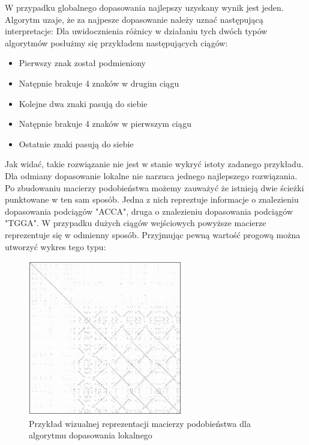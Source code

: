 \documentclass[a4paper,12pt]{article}
\newenvironment{lista}{
\begin{itemize}
  \setlength{\itemsep}{1pt}
  \setlength{\parskip}{0pt}
  \setlength{\parsep}{0pt}
}{\end{itemize}}
\begin{document}
W przypadku globalnego dopasowania najlepszy uzyskany wynik jest jeden. Algorytm uzaje, że za najpesze dopasowanie należy uznać następującą interpretacje: 
Dla uwidocznienia różnicy w działaniu tych dwóch typów algorytmów posłużmy się przykładem następujących ciągów:
\begin{lista}
 \item Pierwszy znak został podmieniony
\item Natępnie brakuje 4 znaków w drugim ciągu
\item Kolejne dwa znaki pasują do siebie
\item Natępnie brakuje 4 znaków w pierwszym ciągu
\item Ostatnie znaki pasują do siebie
\end{lista}

Jak widać, takie rozwiązanie nie jest w stanie wykryć istoty zadanego przykładu. Dla odmiany dopasowanie lokalne nie narzuca jednego najlepszego rozwiązania. Po zbudowaniu macierzy podobieństwa możemy zauważyć że istnieją dwie ścieżki punktowane w ten sam sposób. Jedna z nich repreztuje informacje o znalezieniu dopasowania podciągów "ACCA", druga o znalezieniu dopasowania podciągów "TGGA". W przypadku dużych ciągów wejściowych powyższe macierze reprezentuje się w odmienny sposób. Przyjmując pewną wartość progową można utworzyć wykres tego typu:

\begin{figure}[h]
  \vspace{5pt}
  \centering
  \begin{center}
  \includegraphics[width=0.6\textwidth]{images/macierz.png}
  \end{center}
  \caption{Przykład wizualnej reprezentacji macierzy podobieństwa dla algorytmu dopasowania lokalnego}
\end{figure}
\end{document}
